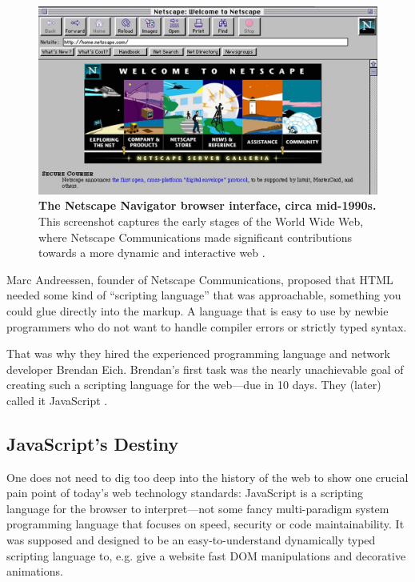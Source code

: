 \documentclass[10pt]{article}
\begin{document}
\begin{sloppypar}
  \begin{figure}[ht]
    \centering
    \includegraphics[width=\textwidth]{figures/netscape.jpg}
    \caption[The Netscape Navigator browser interface, circa mid-1990s]{\textbf{The Netscape Navigator browser interface, circa mid-1990s.} This screenshot captures the early stages of the World Wide Web, where Netscape Communications made significant contributions towards a more dynamic and interactive web \citep{npr_home_nodate}.}
    \label{fig:netscape}
  \end{figure}

  Marc Andreessen, founder of Netscape Communications, proposed that HTML needed some kind of “scripting language” that was approachable, something you could glue directly into the markup. A language that is easy to use by newbie programmers who do not want to handle compiler errors or strictly typed syntax.

  That was why they hired the experienced programming language and network developer Brendan Eich. Brendan’s first task was the nearly unachievable goal of creating such a scripting language for the web—due in 10 days. They (later) called it JavaScript \citep{severance_javascript_2012}.

  \subsection{JavaScript’s Destiny}
  \label{sec:javascript-destiny}

  One does not need to dig too deep into the history of the web to show one crucial pain point of today’s web technology standards: JavaScript is a scripting language for the browser to interpret—not some fancy multi-paradigm system programming language that focuses on speed, security or code maintainability. It was supposed and designed to be an easy-to-understand dynamically typed scripting language to, e.g. give a website fast DOM manipulations and decorative animations.


\end{sloppypar}
\end{document}
